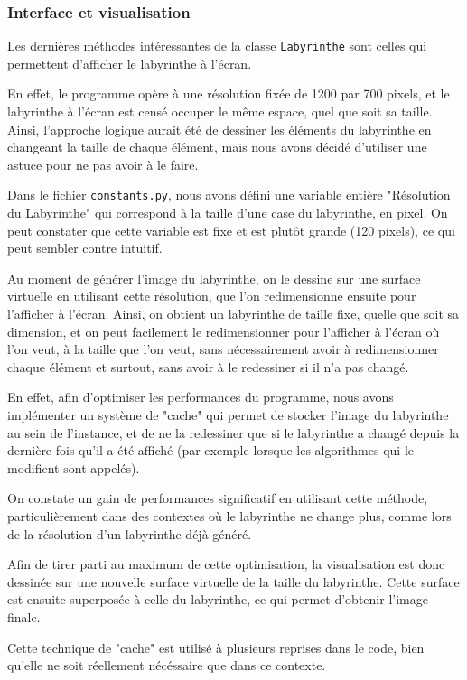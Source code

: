 \documentclass[12pt]{scrreprt} %
\begin{document}
\subsubsection{Interface et visualisation}

Les dernières méthodes intéressantes de la classe \texttt{Labyrinthe} sont celles qui permettent d'afficher le labyrinthe à l'écran.

En effet, le programme opère à une résolution fixée de 1200 par 700 pixels, et le labyrinthe à l'écran est censé occuper le même espace, quel que soit sa taille. Ainsi, l'approche logique aurait été de dessiner les éléments du labyrinthe en changeant la taille de chaque élément, mais nous avons décidé d'utiliser une astuce pour ne pas avoir à le faire.

Dans le fichier \texttt{constants.py}, nous avons défini une variable entière "Résolution du Labyrinthe" qui correspond à la taille d'une case du labyrinthe, en pixel. On peut constater que cette variable est fixe et est plutôt grande (120 pixels), ce qui peut sembler contre intuitif.

Au moment de générer l'image du labyrinthe, on le dessine sur une surface virtuelle en utilisant cette résolution, que l'on redimensionne ensuite pour l'afficher à l'écran. Ainsi, on obtient un labyrinthe de taille fixe, quelle que soit sa dimension, et on peut facilement le redimensionner pour l'afficher à l'écran où l'on veut, à la taille que l'on veut, sans nécessairement avoir à redimensionner chaque élément et surtout, sans avoir à le redessiner si il n'a pas changé.

En effet, afin d'optimiser les performances du programme, nous avons implémenter un système de "cache" qui permet de stocker l'image du labyrinthe au sein de l'instance, et de ne la redessiner que si le labyrinthe a changé depuis la dernière fois qu'il a été affiché (par exemple lorsque les algorithmes qui le modifient sont appelés).

On constate un gain de performances significatif en utilisant cette méthode, particulièrement dans des contextes où le labyrinthe ne change plus, comme lors de la résolution d'un labyrinthe déjà généré.

Afin de tirer parti au maximum de cette optimisation, la visualisation est donc dessinée sur une nouvelle surface virtuelle de la taille du labyrinthe. Cette surface est ensuite superposée à celle du labyrinthe, ce qui permet d'obtenir l'image finale.

Cette technique de "cache" est utilisé à plusieurs reprises dans le code, bien qu'elle ne soit réellement nécéssaire que dans ce contexte.
\end{document}
